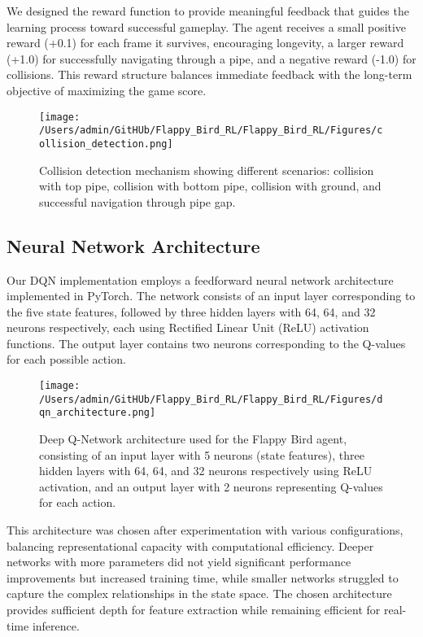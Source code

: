 We designed the reward function to provide meaningful feedback that guides the learning process toward successful gameplay. The agent receives a small positive reward (+0.1) for each frame it survives, encouraging longevity, a larger reward (+1.0) for successfully navigating through a pipe, and a negative reward (-1.0) for collisions. This reward structure balances immediate feedback with the long-term objective of maximizing the game score.
\begin{figure}[!t]
\centering
\texttt{[image: /Users/admin/GitHUb/Flappy\_Bird\_RL/Flappy\_Bird\_RL/Figures/collision\_detection.png]}
\caption{Collision detection mechanism showing different scenarios: collision with top pipe, collision with bottom pipe, collision with ground, and successful navigation through pipe gap.}
\label{fig:collision_detection}
\end{figure}
\subsection{Neural Network Architecture}

Our DQN implementation employs a feedforward neural network architecture implemented in PyTorch. The network consists of an input layer corresponding to the five state features, followed by three hidden layers with 64, 64, and 32 neurons respectively, each using Rectified Linear Unit (ReLU) activation functions. The output layer contains two neurons corresponding to the Q-values for each possible action.
\begin{figure}[!t]
\centering
\texttt{[image: /Users/admin/GitHUb/Flappy\_Bird\_RL/Flappy\_Bird\_RL/Figures/dqn\_architecture.png]}
\caption{Deep Q-Network architecture used for the Flappy Bird agent, consisting of an input layer with 5 neurons (state features), three hidden layers with 64, 64, and 32 neurons respectively using ReLU activation, and an output layer with 2 neurons representing Q-values for each action.}
\label{fig:dqn_architecture}
\end{figure}
This architecture was chosen after experimentation with various configurations, balancing representational capacity with computational efficiency. Deeper networks with more parameters did not yield significant performance improvements but increased training time, while smaller networks struggled to capture the complex relationships in the state space. The chosen architecture provides sufficient depth for feature extraction while remaining efficient for real-time inference.

